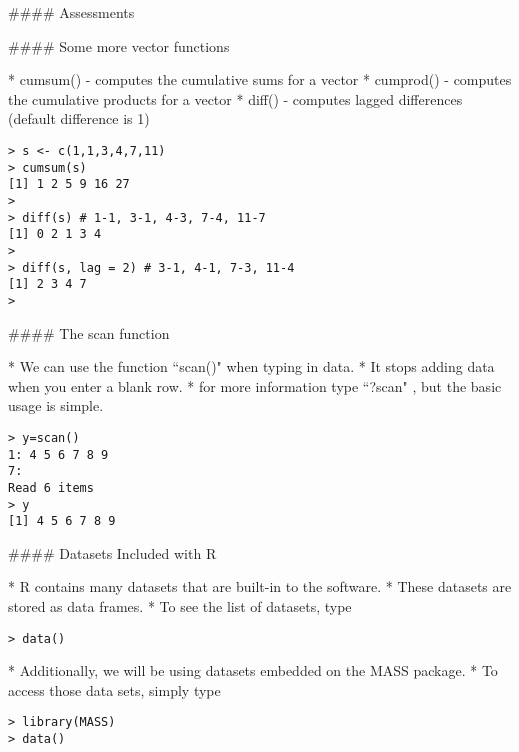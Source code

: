 
#### {Assessments}



#### {Some more vector functions}
\begin{itemize}
* cumsum()  - computes the cumulative sums for a vector
* cumprod() - computes the cumulative products for a vector
* diff()  - computes lagged  differences (default difference is 1)

\begin{verbatim}
> s <- c(1,1,3,4,7,11)
> cumsum(s)
[1] 1 2 5 9 16 27
>
> diff(s) # 1-1, 3-1, 4-3, 7-4, 11-7
[1] 0 2 1 3 4
>
> diff(s, lag = 2) # 3-1, 4-1, 7-3, 11-4
[1] 2 3 4 7
>
\end{verbatim}
\end{itemize}





#### {The scan function}
\begin{itemize}
* We can use the function  ``scan()" when typing in data.
* It stops adding data when you enter a blank row.
* for more information type ``?scan" , but the basic usage is simple.

\begin{verbatim}
> y=scan()
1: 4 5 6 7 8 9
7:
Read 6 items
> y
[1] 4 5 6 7 8 9
\end{verbatim}
\end{itemize}




#### {Datasets Included with R}
\begin{itemize}
* R contains many datasets that are built-in to the software. * These datasets are stored as data
frames. * To see the list of datasets, type
\begin{verbatim}
> data()
\end{verbatim}
* Additionally, we will be using datasets embedded on the MASS package.
* To access those data sets, simply type
\begin{verbatim}
> library(MASS)
> data()
\end{verbatim}
\end{itemize}



